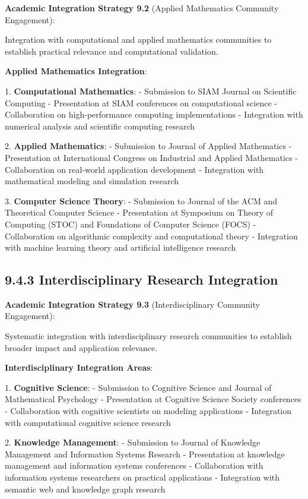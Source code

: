 \textbf{Academic Integration Strategy 9.2} (Applied Mathematics Community Engagement):

Integration with computational and applied mathematics communities to establish practical relevance and computational validation.

\textbf{Applied Mathematics Integration}:

1. \textbf{Computational Mathematics}:
   - Submission to SIAM Journal on Scientific Computing
   - Presentation at SIAM conferences on computational science
   - Collaboration on high-performance computing implementations
   - Integration with numerical analysis and scientific computing research

2. \textbf{Applied Mathematics}:
   - Submission to Journal of Applied Mathematics
   - Presentation at International Congress on Industrial and Applied Mathematics
   - Collaboration on real-world application development
   - Integration with mathematical modeling and simulation research

3. \textbf{Computer Science Theory}:
   - Submission to Journal of the ACM and Theoretical Computer Science
   - Presentation at Symposium on Theory of Computing (STOC) and Foundations of Computer Science (FOCS)
   - Collaboration on algorithmic complexity and computational theory
   - Integration with machine learning theory and artificial intelligence research

\subsection{9.4.3 Interdisciplinary Research Integration}

\textbf{Academic Integration Strategy 9.3} (Interdisciplinary Community Engagement):

Systematic integration with interdisciplinary research communities to establish broader impact and application relevance.

\textbf{Interdisciplinary Integration Areas}:

1. \textbf{Cognitive Science}:
   - Submission to Cognitive Science and Journal of Mathematical Psychology
   - Presentation at Cognitive Science Society conferences
   - Collaboration with cognitive scientists on modeling applications
   - Integration with computational cognitive science research

2. \textbf{Knowledge Management}:
   - Submission to Journal of Knowledge Management and Information Systems Research
   - Presentation at knowledge management and information systems conferences
   - Collaboration with information systems researchers on practical applications
   - Integration with semantic web and knowledge graph research

